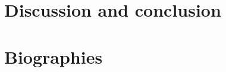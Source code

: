 \documentclass{IEEEcsmag}
\begin{document}



\section{\textbf{Discussion and conclusion}}
\label{sec:discussion}


%

%

%


%

\small


\section*{\textbf{Biographies}}
\label{sec:biographies}

\end{document}
